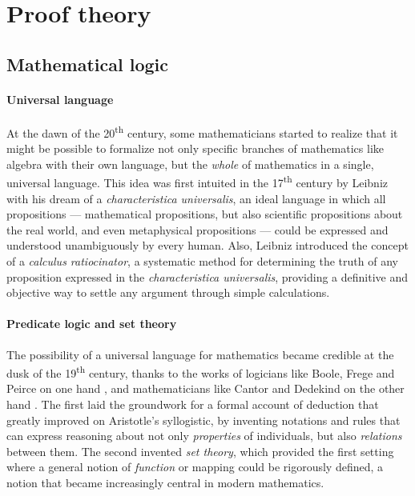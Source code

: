 \section{Proof theory}

\subsection{Mathematical logic}

\paragraph{Universal language}

At the dawn of the 20\textsuperscript{th} century, some mathematicians started
to realize that it might be possible to formalize not only specific branches of
mathematics like algebra with their own language, but the \emph{whole} of
mathematics in a single, universal language. This idea was first intuited in the
17\textsuperscript{th} century by Leibniz with his dream of a
\textit{characteristica universalis}, an ideal language in which all
propositions --- mathematical propositions, but also scientific propositions
about the real world, and even metaphysical propositions --- could be expressed
and understood unambiguously by every human. Also, Leibniz introduced the
concept of a \textit{calculus ratiocinator}, a systematic method for determining
the truth of any proposition expressed in the \textit{characteristica
universalis}, providing a definitive and objective way to settle any argument
through simple calculations.

\paragraph{Predicate logic and set theory}

The possibility of a universal language for mathematics became credible at the
dusk of the 19\textsuperscript{th} century, thanks to the works of logicians
like Boole, Frege and Peirce on one hand
, and mathematicians
like Cantor and Dedekind on the other hand
. The first laid the groundwork
for a formal account of deduction that greatly improved on Aristotle's
syllogistic, by inventing notations and rules that can express reasoning about
not only \emph{properties} of individuals, but also \emph{relations} between
them. The second invented \emph{set theory}, which provided the first setting
where a general notion of \emph{function} or mapping could be rigorously
defined, a notion that became increasingly central in modern mathematics.

